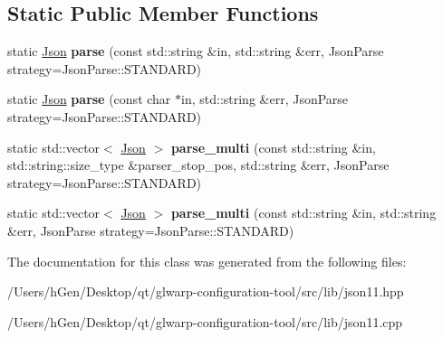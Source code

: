 \subsection*{Static Public Member Functions}
\begin{DoxyCompactItemize}
\item 
\mbox{\label{classjson11_1_1_json_a328337347162b928d9575bc57b3d20da}} 
static \mbox{\hyperlink{classjson11_1_1_json}{Json}} {\bfseries parse} (const std\+::string \&in, std\+::string \&err, Json\+Parse strategy=Json\+Parse\+::\+S\+T\+A\+N\+D\+A\+RD)
\item 
\mbox{\label{classjson11_1_1_json_a9bed3f84db6e24947ea4d17cb67292fc}} 
static \mbox{\hyperlink{classjson11_1_1_json}{Json}} {\bfseries parse} (const char $\ast$in, std\+::string \&err, Json\+Parse strategy=Json\+Parse\+::\+S\+T\+A\+N\+D\+A\+RD)
\item 
\mbox{\label{classjson11_1_1_json_a7325d8835866b416eafc8c502fb33302}} 
static std\+::vector$<$ \mbox{\hyperlink{classjson11_1_1_json}{Json}} $>$ {\bfseries parse\+\_\+multi} (const std\+::string \&in, std\+::string\+::size\+\_\+type \&parser\+\_\+stop\+\_\+pos, std\+::string \&err, Json\+Parse strategy=Json\+Parse\+::\+S\+T\+A\+N\+D\+A\+RD)
\item 
\mbox{\label{classjson11_1_1_json_a33413aabf941e4fa089e4af468a3819e}} 
static std\+::vector$<$ \mbox{\hyperlink{classjson11_1_1_json}{Json}} $>$ {\bfseries parse\+\_\+multi} (const std\+::string \&in, std\+::string \&err, Json\+Parse strategy=Json\+Parse\+::\+S\+T\+A\+N\+D\+A\+RD)
\end{DoxyCompactItemize}


The documentation for this class was generated from the following files\+:\begin{DoxyCompactItemize}
\item 
/\+Users/h\+Gen/\+Desktop/qt/glwarp-\/configuration-\/tool/src/lib/json11.\+hpp\item 
/\+Users/h\+Gen/\+Desktop/qt/glwarp-\/configuration-\/tool/src/lib/json11.\+cpp\end{DoxyCompactItemize}
